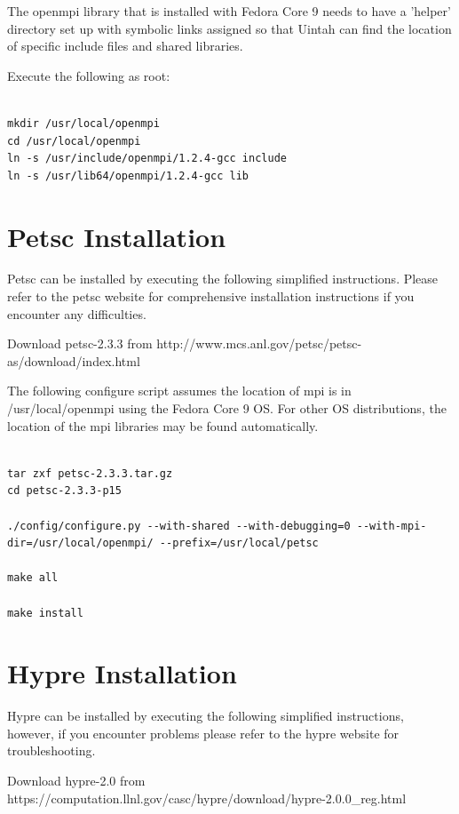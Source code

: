 \documentclass[12pt]{report}
\begin{document}
The openmpi library that is installed with Fedora Core 9 needs to have
a 'helper' directory set up with symbolic links assigned so that
Uintah can find the location of specific include files and shared
libraries.

Execute the following as root:

\begin{Verbatim}

mkdir /usr/local/openmpi
cd /usr/local/openmpi
ln -s /usr/include/openmpi/1.2.4-gcc include
ln -s /usr/lib64/openmpi/1.2.4-gcc lib

\end{Verbatim}



\section{Petsc Installation}

Petsc can be installed by executing the following simplified
instructions.  Please refer to the petsc website for comprehensive
installation instructions if you encounter any difficulties.

Download petsc-2.3.3 from
http://www.mcs.anl.gov/petsc/petsc-as/download/index.html

The following configure script assumes the location of mpi is in
/usr/local/openmpi using the Fedora Core 9 OS.  For other OS
distributions, the location of the mpi libraries may be found
automatically.

\begin{Verbatim}
  
tar zxf petsc-2.3.3.tar.gz
cd petsc-2.3.3-p15

./config/configure.py --with-shared --with-debugging=0 --with-mpi-dir=/usr/local/openmpi/ --prefix=/usr/local/petsc

make all

make install

\end{Verbatim}

\section{Hypre Installation}

Hypre can be installed by executing the following simplified
instructions, however, if you encounter problems please refer to the
hypre website for troubleshooting.

Download hypre-2.0 from
https://computation.llnl.gov/casc/hypre/download/hypre-2.0.0\_reg.html
\end{document}
